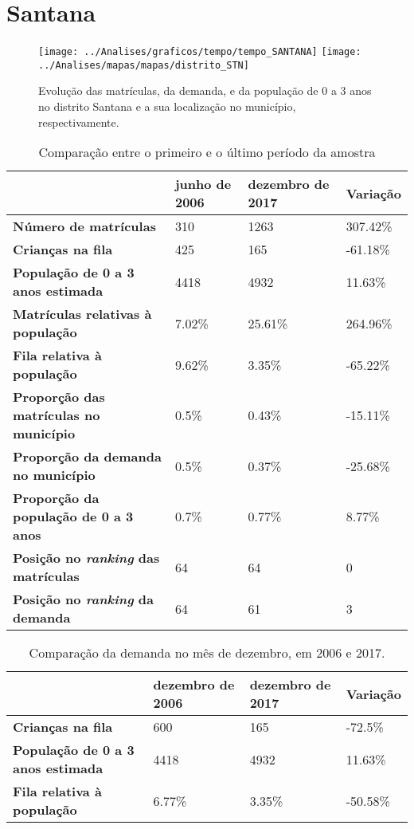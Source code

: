 \section{Santana}
\begin{figure}[H]
\centering
\texttt{[image: ../Analises/graficos/tempo/tempo\_SANTANA]}
\texttt{[image: ../Analises/mapas/mapas/distrito\_STN]}
\caption{Evolução das matrículas, da demanda, e da população de 0 a 3 anos no distrito Santana e a sua localização no município, respectivamente.}
\end{figure}
\begin{table}[H]
\begin{tabular}{l|l|l|l}
\textbf{}                                      & \textbf{junho de 2006}       & \textbf{dezembro de 2017}    & \textbf{Variação} \\ \hline
\textbf{Número de matrículas}                  & 310 & 1263 & 307.42\% \\ \hline
\textbf{Crianças na fila}                      & 425 & 165 & -61.18\% \\ \hline
\textbf{População de 0 a 3 anos estimada}      & 4418 & 4932 & 11.63\% \\ \hline
\textbf{Matrículas relativas à população}      & 7.02\% & 25.61\% & 264.96\% \\ \hline
\textbf{Fila relativa à população}             & 9.62\% & 3.35\% & -65.22\% \\ \hline
\textbf{Proporção das matrículas no município} & 0.5\% & 0.43\% & -15.11\% \\ \hline
\textbf{Proporção da demanda no município}     & 0.5\% & 0.37\% & -25.68\% \\ \hline
\textbf{Proporção da população de 0 a 3 anos}  & 0.7\% & 0.77\% & 8.77\% \\ \hline
\textbf{Posição no \textit{ranking} das matrículas}     & 64 & 64 & 0 \\ \hline
\textbf{Posição no \textit{ranking} da demanda}         & 64 & 61 & 3 \\ 
\end{tabular}
\caption{Comparação entre o primeiro e o último período da amostra}
\end{table}
\begin{table}[H]
\begin{tabular}{l|l|l|l}
\textbf{}                                 & \textbf{dezembro de 2006} & \textbf{dezembro de 2017} & \textbf{Variação} \\ \hline
\textbf{Crianças na fila}                      & 600 & 165 & -72.5\% \\ \hline
\textbf{População de 0 a 3 anos estimada}      & 4418 & 4932 & 11.63\% \\ \hline
\textbf{Fila relativa à população}             & 6.77\% & 3.35\% & -50.58\% \\
\end{tabular}
\caption{Comparação da demanda no mês de dezembro, em 2006 e 2017.}
\end{table}
